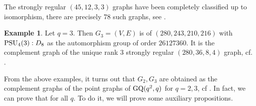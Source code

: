 \documentclass[11pt]{amsart}
\theoremstyle{plain} %
\theoremstyle{definition} %
\newtheorem{ex}[thm]{Example} %
\newtheorem{rem}[thm]{Remark} %
\newtheorem*{ques}{Question}
\theoremstyle{remark} %
\begin{document}
The strongly regular $(45,12,3,3)$ graphs have been completely classified up to isomorphism, there are precisely 78 such graphs, see \cite{CDS}.
\begin{ex}%
Let $q=3$. Then $G_3=(V,E)$ is of
$(280,243,210,216)$ with ${\rm PSU}_4(3) : D_8$ as the automorphism group of order $26127360$. It is the complement graph of the unique rank 3 strongly regular $(280,36,8,4)$ graph, cf. \cite[p.292]{BV}.
\end{ex}
From the above examples, it turns out that $G_2,G_3$ are obtained as the complement graphs of the point graphs of
${\rm GQ}(q^2,q)$ for $q=2,3$, cf \cite[\S10]{BV}. In fact, we can prove that
for all $q$. To do it, we will prove some auxiliary propositions.
\end{document}
